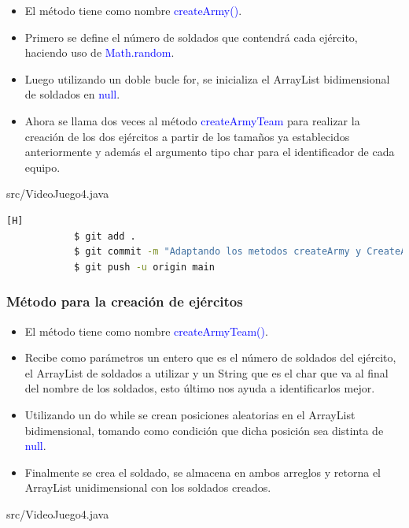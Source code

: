 \documentclass{article}
\begin{document}
        \begin{itemize}
            \item El método tiene como nombre \textcolor{blue}{createArmy()}.
            \item Primero se define el número de soldados que contendrá cada ejército, haciendo uso de \textcolor{blue}{Math.random}.
            \item Luego utilizando un doble bucle for, se inicializa el ArrayList bidimensional de soldados en \textcolor{blue}{null}.
            \item Ahora se llama dos veces al método \textcolor{blue}{createArmyTeam} para realizar la creación de los dos ejércitos a partir de los tamaños ya establecidos anteriormente y además el argumento tipo char para el identificador de cada equipo.
        \end{itemize}

        
        {src/VideoJuego4.java}
        
        \begin{lstlisting}[language=bash,caption={Commit \href{https://github.com/hernanchoquehuanca/fp2-23b/commit/598a62d5d65db6832192e50b6ef383709a550043}{598a62d}: Se implementó el método createArmy()}][H]
    		$ git add .
    		$ git commit -m "Adaptando los metodos createArmy y CreateArmyTeam para que trabajen ahora con los arreglos bidimensionales de soldados que es la estructura de datos de nuestro tablero"			
    		$ git push -u origin main
    	\end{lstlisting}
        
        \subsubsection{Método para la creación de ejércitos}

        \begin{itemize}
            \item El método tiene como nombre \textcolor{blue}{createArmyTeam()}.
            \item Recibe como parámetros un entero que es el número de soldados del ejército, el ArrayList de soldados a utilizar y un String que es el char que va al final del nombre de los soldados, esto último nos ayuda a identificarlos mejor.
            \item Utilizando un do while se crean posiciones aleatorias en el ArrayList bidimensional, tomando como condición que dicha posición sea distinta de \textcolor{blue}{null}.
            \item Finalmente se crea el soldado, se almacena en ambos arreglos y retorna el ArrayList unidimensional con los soldados creados.

        \end{itemize}
        \newpage
        
        {src/VideoJuego4.java}
\end{document}
